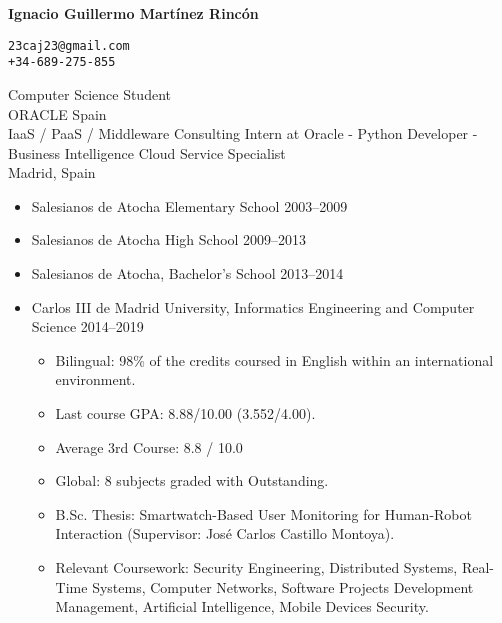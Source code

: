 \documentclass[11pt]{article}
\renewcommand{\section}[1]
{\vspace{1.0\baselineskip}{\Large\textbf{#1}}}
\begin{document}

\thispagestyle{empty}

\parbox[c][0.5in]{3.4in}{\huge \textbf{Ignacio Guillermo Martínez Rincón}}
\parbox[c][0.5in]{2.5in}{%
\small
\vspace{17ex}
\texttt{23caj23@gmail.com \\ +34-689-275-855}
}

Computer Science Student \\
ORACLE Spain \\
IaaS / PaaS / Middleware Consulting Intern at Oracle - Python Developer - Business Intelligence Cloud Service Specialist \\
Madrid, Spain

\section{Education}

\begin{itemize}[leftmargin=12pt]
  \item[] Salesianos de Atocha Elementary School \hfill 2003--2009
  \item[] Salesianos de Atocha High School \hfill 2009--2013
  \item[] Salesianos de Atocha, Bachelor's School \hfill 2013--2014
  \item[] Carlos III de Madrid University, Informatics Engineering and Computer Science \hfill 2014--2019
  \begin{itemize}
      \item Bilingual: 98\% of the credits coursed in English within an international environment.
      \item Last course GPA: 8.88/10.00 (3.552/4.00).
      \item Average 3rd Course: 8.8 / 10.0
      \item Global: 8 subjects graded with Outstanding.
      \item B.Sc. Thesis: Smartwatch-Based User Monitoring for Human-Robot Interaction (Supervisor: José Carlos Castillo Montoya).
      \item Relevant Coursework: Security Engineering, Distributed Systems, Real-Time Systems, Computer Networks, Software Projects Development Management, Artificial Intelligence, Mobile Devices Security.
  \end{itemize}
\end{itemize}

\section{Employment}
\end{document}
